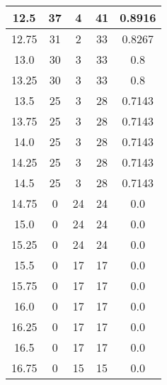 \documentclass[letterpaper, 12pt]{article}
\begin{document}
\begin{longtable}{|c|c|c|c|c|}
\hline
12.5 & 37 & 4 & 41 & 0.8916 \\
\hline
12.75 & 31 & 2 & 33 & 0.8267 \\
\hline
13.0 & 30 & 3 & 33 & 0.8 \\
\hline
13.25 & 30 & 3 & 33 & 0.8 \\
\hline
13.5 & 25 & 3 & 28 & 0.7143 \\
\hline
13.75 & 25 & 3 & 28 & 0.7143 \\
\hline
14.0 & 25 & 3 & 28 & 0.7143 \\
\hline
14.25 & 25 & 3 & 28 & 0.7143 \\
\hline
14.5 & 25 & 3 & 28 & 0.7143 \\
\hline
14.75 & 0 & 24 & 24 & 0.0 \\
\hline
15.0 & 0 & 24 & 24 & 0.0 \\
\hline
15.25 & 0 & 24 & 24 & 0.0 \\
\hline
15.5 & 0 & 17 & 17 & 0.0 \\
\hline
15.75 & 0 & 17 & 17 & 0.0 \\
\hline
16.0 & 0 & 17 & 17 & 0.0 \\
\hline
16.25 & 0 & 17 & 17 & 0.0 \\
\hline
16.5 & 0 & 17 & 17 & 0.0 \\
\hline
16.75 & 0 & 15 & 15 & 0.0 \\
\hline
\end{longtable}
\end{document}
